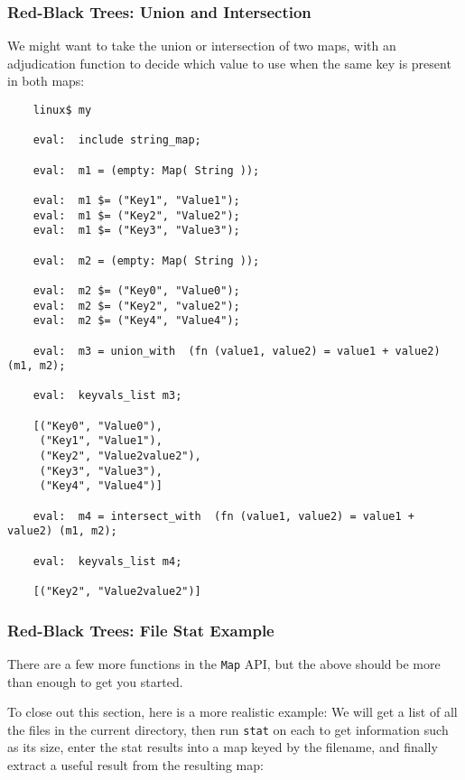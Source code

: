 \subsubsection{Red-Black Trees:  Union and Intersection}

We might want to take the union or intersection of two maps, 
with an adjudication function to decide which value to use 
when the same key is present in both maps:

\begin{verbatim}
    linux$ my

    eval:  include string_map;

    eval:  m1 = (empty: Map( String ));

    eval:  m1 $= ("Key1", "Value1");
    eval:  m1 $= ("Key2", "Value2");
    eval:  m1 $= ("Key3", "Value3");

    eval:  m2 = (empty: Map( String ));

    eval:  m2 $= ("Key0", "Value0");
    eval:  m2 $= ("Key2", "value2");
    eval:  m2 $= ("Key4", "Value4");

    eval:  m3 = union_with  (fn (value1, value2) = value1 + value2) (m1, m2);

    eval:  keyvals_list m3;

    [("Key0", "Value0"),
     ("Key1", "Value1"), 
     ("Key2", "Value2value2"),
     ("Key3", "Value3"), 
     ("Key4", "Value4")]

    eval:  m4 = intersect_with  (fn (value1, value2) = value1 + value2) (m1, m2);

    eval:  keyvals_list m4;

    [("Key2", "Value2value2")]
\end{verbatim}


\cutend*

\subsubsection{Red-Black Trees:  File Stat Example}

There are a few more functions in the {\tt Map} API, but the above 
should be more than enough to get you started.

To close out this section, here is a more realistic example:  We 
will get a list of all the files in the current directory, then 
run {\tt stat} on each to get information such as its size, enter 
the stat results into a map keyed by the filename, and finally 
extract a useful result from the resulting map:

